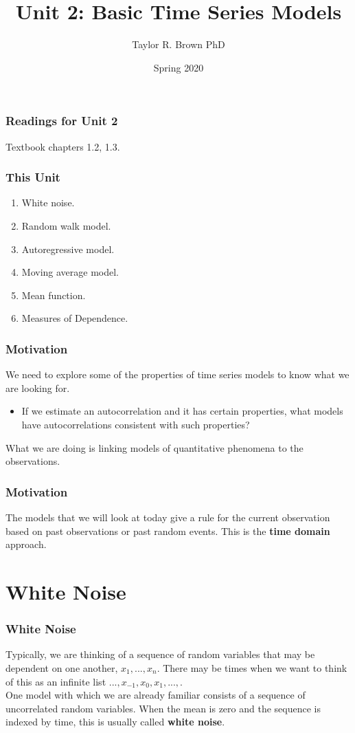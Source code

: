 \documentclass[%
xcolor=pdftex]{beamer}
\title{Unit 2: Basic Time Series Models}
\author[STAT 5170: Applied Time Series, Unit 2]{Taylor R. Brown PhD}
\institute{Department of Statistics, University of Virginia}
\date{Spring 2020}
\begin{document}
\frame{\titlepage}


\begin{frame}
\frametitle{Readings for Unit 2}

Textbook chapters 1.2, 1.3.

\end{frame}

\begin{frame}
\frametitle{This Unit}
\begin{enumerate}
\item White noise.
\item Random walk model.
\item Autoregressive model.
\item Moving average model.
\item Mean function.
\item Measures of Dependence.
\end{enumerate}
\end{frame}

\begin{frame}
\frametitle{Motivation}
We need to explore some of
the properties of time series models to know what we are
looking for. 

\begin{itemize}
\item If we estimate an autocorrelation and it has certain
properties, what models have autocorrelations consistent with such properties?
\end{itemize}

What we are doing is linking models of quantitative
phenomena to the observations.
\end{frame}

\begin{frame}
\frametitle{Motivation}
The models that we will look at today give a rule for the current
observation based on past observations or past random events. This is the \textbf{time domain} approach. 
\end{frame}

\section{White Noise}
\frame{\tableofcontents[currentsection]}

\begin{frame}
\frametitle{White Noise}
Typically, we are thinking of a sequence of random variables
that may be dependent on one another, $x_1,...,x_n$.  There
may be times when we want to think of this as an infinite list
$...,x_{-1}, x_0, x_1,...,$.  \\
\vspace{5mm}
One model with which we are already familiar
consists of a sequence of uncorrelated random variables.  When the mean
is zero and the sequence is indexed by time, this is usually
called \textbf{white noise}.

\end{frame}
\end{document}
